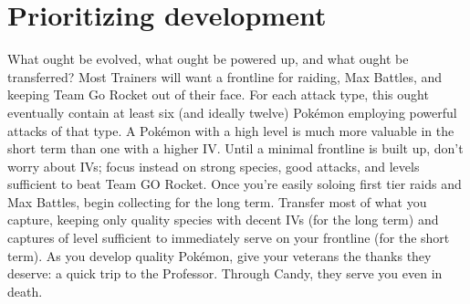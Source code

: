\section{Prioritizing development}
\label{sec:developmentpriority}
What ought be evolved, what ought be powered up, and what ought be transferred?
Most Trainers will want a frontline for raiding, Max Battles, and keeping Team Go Rocket out of their face.
For each attack type, this ought eventually contain at least six (and ideally twelve) Pokémon
  employing powerful attacks of that type.
A Pokémon with a high level is much more valuable in the short term than one with a higher IV.
Until a minimal frontline is built up, don't worry about IVs; focus instead on strong species,
  good attacks, and levels sufficient to beat Team GO Rocket.
Once you're easily soloing first tier raids and Max Battles, begin collecting for the long term.
Transfer most of what you capture, keeping only quality species with decent IVs (for the long term)
  and captures of level sufficient to immediately serve on your frontline (for the short term).
As you develop quality Pokémon, give your veterans the thanks they deserve: a quick trip to the Professor.
Through Candy, they serve you even in death.
